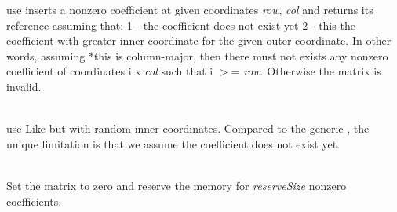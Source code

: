 \begin{DoxyRefList}
\label{deprecated__deprecated000040}%
%
use  inserts a nonzero coefficient at given coordinates {\itshape row}, {\itshape col} and returns its reference assuming that\+: 1 -\/ the coefficient does not exist yet 2 -\/ this the coefficient with greater inner coordinate for the given outer coordinate. In other words, assuming {\ttfamily \texorpdfstring{$\ast$}{*}this} is column-\/major, then there must not exists any nonzero coefficient of coordinates {\ttfamily i} {\ttfamily x} {\itshape col} such that {\ttfamily i} \texorpdfstring{$>$}{>}= {\itshape row}. Otherwise the matrix is invalid. 
\item[メンバ \doxylink{class_eigen_1_1_dynamic_sparse_matrix_a9cbefc5fea823711bd075419c6d68334_a9cbefc5fea823711bd075419c6d68334}{Eigen\+::Dynamic\+Sparse\+Matrix\texorpdfstring{$<$}{<} \+\_\+\+Scalar, \+\_\+\+Options, \+\_\+\+Storage\+Index \texorpdfstring{$>$}{>}\+::fillrand} (Index row, Index col)]\hfill \\
\label{deprecated__deprecated000041}%
%
use  Like  but with random inner coordinates. Compared to the generic , the unique limitation is that we assume the coefficient does not exist yet.  
\item[メンバ \doxylink{class_eigen_1_1_dynamic_sparse_matrix_abade0bf46139d8577aa24ead30c76771_abade0bf46139d8577aa24ead30c76771}{Eigen\+::Dynamic\+Sparse\+Matrix\texorpdfstring{$<$}{<} \+\_\+\+Scalar, \+\_\+\+Options, \+\_\+\+Storage\+Index \texorpdfstring{$>$}{>}\+::start\+Fill} (Index reserve\+Size=1000)]\hfill \\
\label{deprecated__deprecated000039}%
%
 Set the matrix to zero and reserve the memory for {\itshape reserve\+Size} nonzero coefficients.  
\item[メンバ \doxylink{class_eigen_1_1_eigen_solver_aab95ece89f162cdedb3ce33611d81ed3_aab95ece89f162cdedb3ce33611d81ed3}{Eigen\+::Eigen\+Solver\texorpdfstring{$<$}{<} \+\_\+\+Matrix\+Type \texorpdfstring{$>$}{>}\+::Index} ]\hfill \\

\end{DoxyRefList}
